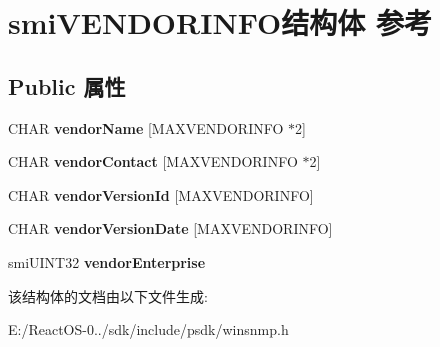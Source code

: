 \hypertarget{structsmi_v_e_n_d_o_r_i_n_f_o}{}\section{smi\+V\+E\+N\+D\+O\+R\+I\+N\+F\+O结构体 参考}
\label{structsmi_v_e_n_d_o_r_i_n_f_o}
\subsection*{Public 属性}
\begin{DoxyCompactItemize}
\item 
\mbox{\label{structsmi_v_e_n_d_o_r_i_n_f_o_a130df3904610dfeda65804b73c1b8335}} 
C\+H\+AR {\bfseries vendor\+Name} \mbox{[}M\+A\+X\+V\+E\+N\+D\+O\+R\+I\+N\+FO $\ast$2\mbox{]}
\item 
\mbox{\label{structsmi_v_e_n_d_o_r_i_n_f_o_a8454c4bfb09b37ba649307c9b966cc5d}} 
C\+H\+AR {\bfseries vendor\+Contact} \mbox{[}M\+A\+X\+V\+E\+N\+D\+O\+R\+I\+N\+FO $\ast$2\mbox{]}
\item 
\mbox{\label{structsmi_v_e_n_d_o_r_i_n_f_o_a4f9f8ade7f2fd37caad75bf796fedae8}} 
C\+H\+AR {\bfseries vendor\+Version\+Id} \mbox{[}M\+A\+X\+V\+E\+N\+D\+O\+R\+I\+N\+FO\mbox{]}
\item 
\mbox{\label{structsmi_v_e_n_d_o_r_i_n_f_o_ad4e2c38747de7a255538d8e6d5f7785a}} 
C\+H\+AR {\bfseries vendor\+Version\+Date} \mbox{[}M\+A\+X\+V\+E\+N\+D\+O\+R\+I\+N\+FO\mbox{]}
\item 
\mbox{\label{structsmi_v_e_n_d_o_r_i_n_f_o_af6cf1b96e8fd038591d5703a27abdece}} 
smi\+U\+I\+N\+T32 {\bfseries vendor\+Enterprise}
\end{DoxyCompactItemize}


该结构体的文档由以下文件生成\+:\begin{DoxyCompactItemize}
\item 
E\+:/\+React\+O\+S-\/0../sdk/include/psdk/winsnmp.\+h\end{DoxyCompactItemize}
